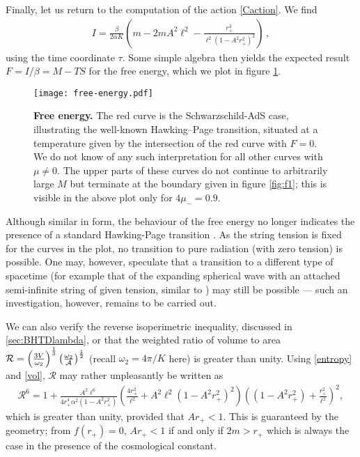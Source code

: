 \documentclass[
twoside,
openright,
frontopenright,
]{dmathesis}
\begin{document}
Finally, let us return to the computation of the action \eqref{Caction}.
We find
\begin{align}
I = \frac{\beta}{2\alpha K} \left( m - 2mA^2\ell^2
- \frac{r_+^3}{\ell^2(1-A^2r_+^2)^2} \right)\,,
\label{Caction}
\end{align}
using the time coordinate $\tau$. Some simple algebra then yields the
expected result $F=I/\beta=M-TS$
for the free energy, which we plot in figure \ref{fig:FE}.
\begin{figure}[tbp]
\centering
\texttt{[image: free-energy.pdf]}
\caption{\textbf{Free energy.}
The red curve is the Schwarzschild-AdS case, illustrating the
well-known Hawking--Page transition,  situated at a temperature
given by the intersection of the red curve with $F=0$. We do
not know of any such interpretation for all other curves with $\mu\neq 0$.
The upper parts of these curves do not continue to arbitrarily large $M$
but terminate at the boundary given in figure
\ref{fig:f1}; this is visible in the above plot only for $4\mu_- =0.9$.   }
\label{fig:FE}
\end{figure}

Although similar in form, the behaviour of the free energy no longer indicates
the presence of a standard Hawking-Page transition \cite{Hawking:1982dh}.
As the string tension is fixed for the curves in the plot, no transition to
pure radiation (with zero tension) is possible. One may, however, speculate that
a transition to a different type of spacetime (for example {that of the expanding spherical wave with an attached semi-infinite string of given tension, similar to} \cite{Podolsky:2004bk})
may still be possible --- such an investigation, however, remains to be carried out.

We can also verify the reverse isoperimetric inequality, discussed in \cref{sec:BHTDlambda}, or that the weighted ratio of volume to
area $\mathcal{R}=\left( \frac{3{V}}{\omega _{2}}\right)^{\frac{1}{3}}
\left(\frac{\omega _{2}}{{\cal A}}\right) ^{\frac{1}{2}}$ (recall $\omega_2=4\pi/K$
here) is greater than unity. Using \cref{entropy} and \cref{vol}, $\mathcal{R}$
may rather unpleasantly be written as
\begin{align}
  \mathcal{R}^6 = 1 + \frac{A^2\ell^6}{4r_+^4\alpha^2(1-A^2r_+^2)}
  \left(\frac{4r_+^2}{\ell^2} 
  + A^2 \ell^2 (1-A^2 r_+^2)^2\right)
  \left((1-A^2r_+^2)+\frac{r_+^2}{\ell^2}\right)^2, 
\end{align}
which is greater than unity, provided that $Ar_+<1$. This is guaranteed by the
geometry; from $f(r_+) = 0$, $Ar_+<1$ if and only if $2m > r_+$ which is always
the case in the presence of the cosmological constant.
\end{document}
